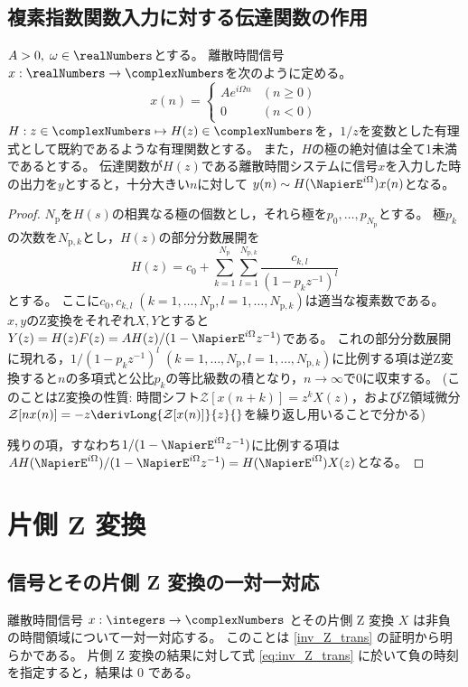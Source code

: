 		\section{複素指数関数入力に対する伝達関数の作用}
			\begin{shadebox}
				$A>0,\;\omega \in \realNumbers$とする。
				離散時間信号$x: \realNumbers \to \complexNumbers$を次のように定める。
				\[
					x(n) =
					\begin{cases}
						Ae^{i\Omega n} & (n\geq 0) \\
						0 & (n<0)
					\end{cases}
				\]
				$H: z\in\complexNumbers \mapsto H(z) \in \complexNumbers$を，$1/z$を変数とした有理式として既約であるような有理関数とする。
				また，$H$の極の絶対値は全て1未満であるとする。
				伝達関数が$H(z)$である離散時間システムに信号$x$を入力した時の出力を$y$とすると，十分大きい$n$に対して
				$y(n) \sim H(\NapierE^{i\Omega})x(n)$となる。
			\end{shadebox}
			\begin{proof}
				\quad\par
				$N_\text{p}$を$H(s)$の相異なる極の個数とし，それら極を$p_0,\dots,p_{N_\text{p}}$とする。
				極$p_k$の次数を$N_{\text{p},k}$とし，$H(z)$の部分分数展開を
				\[ H(z) = c_0 + \sum_{k=1}^{N_\mathrm{p}} \sum_{l=1}^{N_{\mathrm{p},k}} \frac{c_{k,l}}{(1-p_kz^{-1})^l} \]
				とする。
				ここに$c_0,c_{k,l}\;(k=1,\dots,N_\mathrm{p},l=1,\dots,N_{\mathrm{p},k})$は適当な複素数である。
				$x,y$のZ変換をそれぞれ$X,Y$とすると$Y(z) = H(z)F(z) = A H(z)/(1-\NapierE^{i\Omega}z^{-1})$である。
				これの部分分数展開に現れる，$1/(1-p_k z^{-1})^l\;(k=1,\dots,N_\mathrm{p},l=1,\dots,N_{\mathrm{p},k})$に比例する項は逆Z変換すると$n$の多項式と公比$p_k$の等比級数の積となり，$n\to\infty$で0に収束する。
				(このことはZ変換の性質: 時間シフト$\mathcal{Z}[x(n+k)] = z^kX(z)$，およびZ領域微分$\mathcal{Z}[nx(n)] = -z\derivLong{\mathcal{Z}[x(n)]}{z}{}$を繰り返し用いることで分かる)
				\par
				残りの項，すなわち$1/(1-\NapierE^{i\Omega}z^{-1})$に比例する項は$AH(\NapierE^{i\Omega})/(1-\NapierE^{i\Omega}z^{-1}) = H(\NapierE^{i\Omega})X(z)$となる。
			\end{proof}
	\chapter{片側 Z 変換}
		\section{信号とその片側 Z 変換の一対一対応}
			離散時間信号 $x:\integers\to\complexNumbers$ とその片側 Z 変換 $X$ は非負の時間領域について一対一対応する。
			このことは \ref{inv_Z_trans} の証明から明らかである。
			片側 Z 変換の結果に対して式 \eqref{eq:inv_Z_trans} に於いて負の時刻を指定すると，結果は 0 である。

